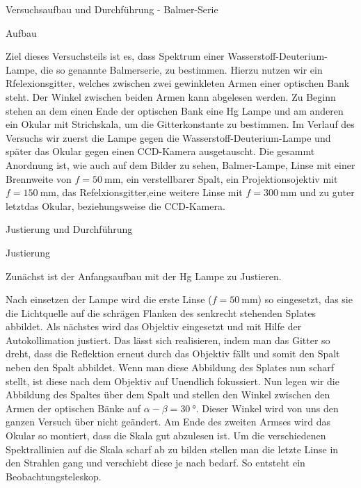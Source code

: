 \documentclass[pdftex, a4paper,11pt, twoside, ngerman]{report}
\begin{document}
  \begin{chapter}{Versuchsaufbau und Durchführung - Balmer-Serie}

      \begin{section}{Aufbau}

          Ziel dieses Versuchsteils ist es, dass Spektrum einer Wasserstoff-Deuterium-Lampe, die so genannte Balmerserie, zu bestimmen.
          Hierzu nutzen wir ein Rfelexionsgitter, welches zwischen zwei gewinkleten Armen einer optischen Bank steht.
          Der Winkel zwischen beiden Armen kann abgelesen werden.
          Zu Beginn stehen an dem einen Ende der optischen Bank eine Hg Lampe und am anderen ein Okular mit Strichskala, um die Gitterkonstante zu bestimmen. 
          Im Verlauf des Versuchs wir zuerst die Lampe gegen die Wasserstoff-Deuterium-Lampe und später das Okular gegen einen CCD-Kamera ausgetauscht.
          Die gesammt Anordnung ist, wie auch auf dem Bilder zu sehen, Balmer-Lampe, Linse mit einer Brennweite von $f=\SI{50}{\milli\meter}$, ein verstellbarer Spalt, ein Projektionsojektiv mit $f=\SI{150}{\milli\meter}$, das Refelxionsgitter,eine weitere Linse mit $f=\SI{300}{\milli\meter}$ und zu guter letztdas Okular, beziehungsweise die CCD-Kamera.

      \end{section}

      \begin{section}{Justierung und Durchführung}

          \begin{subsection}{Justierung}

          Zunächst ist der Anfangsaufbau mit der Hg Lampe zu Justieren.
        
          Nach einsetzen der Lampe wird die erste Linse ($f=\SI{50}{\milli\meter}$) so eingesetzt, das sie die Lichtquelle auf die schrägen Flanken des senkrecht stehenden Splates abbildet.
          Als nächstes wird das Objektiv eingesetzt und mit Hilfe der Autokollimation justiert.
          Das lässt sich realisieren, indem man das Gitter so dreht, dass die Reflektion erneut durch das Objektiv fällt und somit den Spalt neben den Spalt abbildet. 
          Wenn man diese Abbildung des Splates nun scharf stellt, ist diese nach dem Objektiv auf Unendlich fokussiert.
          Nun legen wir die Abbildung des Spaltes über dem Spalt und stellen den Winkel zwischen den Armen der optischen Bänke auf $\alpha-\beta = \SI{30}{\degree}$.
          Dieser Winkel wird von uns den ganzen Versuch über nicht geändert.
          Am Ende des zweiten Armses wird das Okular so montiert, dass die Skala gut abzulesen ist. 
          Um die verschiedenen Spektrallinien auf die Skala scharf ab zu bilden stellen man die letzte Linse in den Strahlen gang und verschiebt diese je nach bedarf.
          So entsteht ein Beobachtungsteleskop.


\end{subsection}
\end{section}
\end{chapter}
\end{document}
